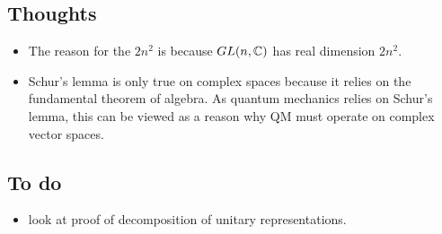 \documentclass[a4paper]{article}
\begin{document}
\subsection{Thoughts}
\begin{itemize}
    \item The reason for the $2n^2$ is because $GL(n, \mathbb{C})$ has real dimension $2n^2$.
    \item Schur's lemma is only true on complex spaces because it relies on the fundamental theorem of algebra. As quantum mechanics relies on Schur's lemma, this can be viewed as a reason why QM must operate on complex vector spaces.
\end{itemize}

\subsection{To do}
\begin{itemize}
    \item look at proof of decomposition of unitary representations.
\end{itemize}
\end{document}

